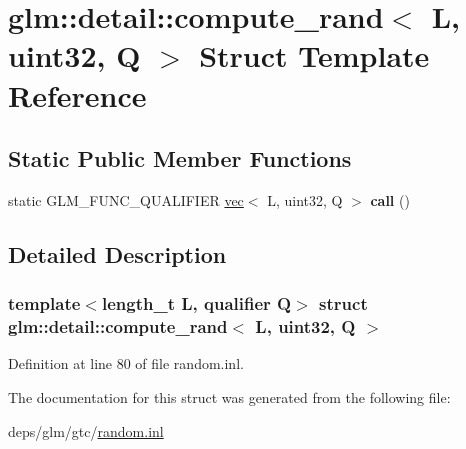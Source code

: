 \hypertarget{structglm_1_1detail_1_1compute__rand_3_01L_00_01uint32_00_01Q_01_4}{}\section{glm\+:\+:detail\+:\+:compute\+\_\+rand$<$ L, uint32, Q $>$ Struct Template Reference}
\label{structglm_1_1detail_1_1compute__rand_3_01L_00_01uint32_00_01Q_01_4}
\subsection*{Static Public Member Functions}
\begin{DoxyCompactItemize}
\item 
\mbox{\label{structglm_1_1detail_1_1compute__rand_3_01L_00_01uint32_00_01Q_01_4_a3f7bf8e5c44f275c59678a82cc6087ea}} 
static G\+L\+M\+\_\+\+F\+U\+N\+C\+\_\+\+Q\+U\+A\+L\+I\+F\+I\+ER \hyperlink{structglm_1_1vec}{vec}$<$ L, uint32, Q $>$ {\bfseries call} ()
\end{DoxyCompactItemize}


\subsection{Detailed Description}
\subsubsection*{template$<$length\+\_\+t L, qualifier Q$>$\newline
struct glm\+::detail\+::compute\+\_\+rand$<$ L, uint32, Q $>$}



Definition at line 80 of file random.\+inl.



The documentation for this struct was generated from the following file\+:\begin{DoxyCompactItemize}
\item 
deps/glm/gtc/\hyperlink{random_8inl}{random.\+inl}\end{DoxyCompactItemize}
